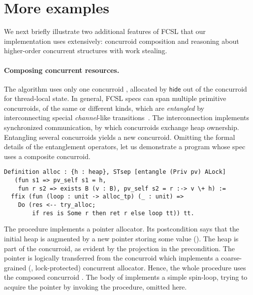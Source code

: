 \section{More examples}
\label{sec:more-examples}

We next briefly illustrate two additional features of FCSL that our
implementation uses extensively: concurroid composition and reasoning
about higher-order concurrent structures with work stealing.

\paragraph{Composing concurrent resources.~~}
\label{sec:comp-conc-reso}

The  algorithm uses only one concurroid ,
allocated by $\mathsf{hide}$ out of the concurroid  for
thread-local state.
%
In general, FCSL specs can span multiple primitive concurroids, of the
same or different kinds, which are \emph{entangled} by interconnecting
special \emph{channel}-like transitions~\cite{Nanevski-al:ESOP14}. The interconnection
implements synchronized communication, by which concurroids 
exchange heap ownership.
%
Entangling several concurroids yields a new concurroid.
%
Omitting the formal details of the entanglement
operators, let us demonstrate a program
whose spec uses a composite concurroid.
%
\begin{lstlisting}
Definition alloc : {h : heap}, STsep [entangle (Priv pv) ALock] 
   (fun s1 => pv_self s1 = h, 
    fun r s2 => exists B (v : B), pv_self s2 = r :-> v \+ h) := 
  ffix (fun (loop : unit -> alloc_tp) (_ : unit) =>
    Do (res <-- try_alloc; 
        if res is Some r then ret r else loop tt)) tt.  
\end{lstlisting}
%
The  procedure implements a pointer allocator. Its
postcondition says that the initial heap  is augmented by a
new pointer  storing some value  (). The
heap  is part of the  concurroid, as evident by the
projection  in the precondition. The pointer  is
logically transferred from the concurroid  which
implements a coarse-grained (\ie, lock-protected) concurrent
allocator. Hence, the whole procedure  uses the composed
concurroid .
%
The body of  implements a simple spin-loop, trying to
acquire the pointer by invoking the  procedure, omitted
here.

